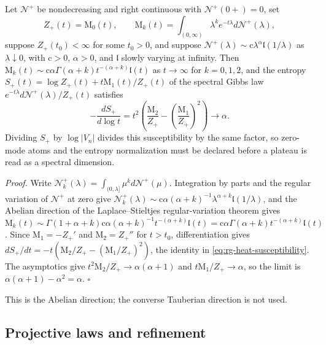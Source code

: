 Let \(\mathcal N^+\) be nondecreasing and right continuous with
\(\mathcal N^+(0+)=0\), set
\[
Z_+(t)=\mathrm M_0(t),
\qquad
\mathrm M_k(t)=\int_{(0,\infty)}\lambda^ke^{-t\lambda}d\mathcal N^+(\lambda),
\]
suppose \(Z_+(t_0)<\infty\) for some \(t_0>0\), and suppose
\(\mathcal N^+(\lambda)\sim\mathrm c\lambda^\alpha\mathfrak l(1/\lambda)\) as
\(\lambda\downarrow0\), with \(\mathrm c>0\), \(\alpha>0\), and \(\mathfrak l\)
slowly varying at infinity. Then
\(\mathrm M_k(t)\sim\mathrm c\alpha\Gamma(\alpha+k)t^{-(\alpha+k)}\mathfrak l(t)\)
as \(t\to\infty\) for \(k=0,1,2\), and the entropy
\(S_+(t)=\log Z_+(t)+t\mathrm M_1(t)/Z_+(t)\) of the spectral Gibbs law
\(e^{-t\lambda}d\mathcal N^+(\lambda)/Z_+(t)\) satisfies
\begin{equation}
-\frac{dS_+}{d\log t}
=t^2\left(\frac{\mathrm M_2}{Z_+}-\left(\frac{\mathrm M_1}{Z_+}\right)^2\right)
\longrightarrow\alpha.
\label{eq:rg-heat-susceptibility}
\end{equation}
Dividing \(S_+\) by \(\log\lvert V_n\rvert\) divides this susceptibility by the
same factor, so zero-mode atoms and the entropy normalization must be declared
before a plateau is read as a spectral dimension. 

\noindent\emph{Proof.}
Write \(\mathcal N^+_k(\lambda)=\int_{(0,\lambda]}\mu^kd\mathcal N^+(\mu)\).
Integration by parts and the regular variation of \(\mathcal N^+\) at zero give
\(\mathcal N^+_k(\lambda)\sim\mathrm c\alpha(\alpha+k)^{-1}
\lambda^{\alpha+k}\mathfrak l(1/\lambda)\), and the Abelian direction of the
Laplace--Stieltjes regular-variation theorem
\citep[\S1.7.1]{BinghamGoldieTeugels1987} gives
\(\mathrm M_k(t)\sim\Gamma(1+\alpha+k)\mathrm c\alpha(\alpha+k)^{-1}
t^{-(\alpha+k)}\mathfrak l(t)=\mathrm c\alpha\Gamma(\alpha+k)
t^{-(\alpha+k)}\mathfrak l(t)\). Since \(\mathrm M_1=-Z_+'\) and
\(\mathrm M_2=Z_+''\) for \(t>t_0\), differentiation gives
\(dS_+/dt=-t(\mathrm M_2/Z_+-(\mathrm M_1/Z_+)^2)\), the identity in
\eqref{eq:rg-heat-susceptibility}. The asymptotics give
\(t^2\mathrm M_2/Z_+\to\alpha(\alpha+1)\) and \(t\mathrm M_1/Z_+\to\alpha\), so the
limit is \(\alpha(\alpha+1)-\alpha^2=\alpha\). \(\square\)

This is the Abelian direction; the converse Tauberian direction is not used.

\subsection{Projective laws and refinement}
\label{sec:rg-projective-refinement}
\label{sec:cg-projective-laws}

